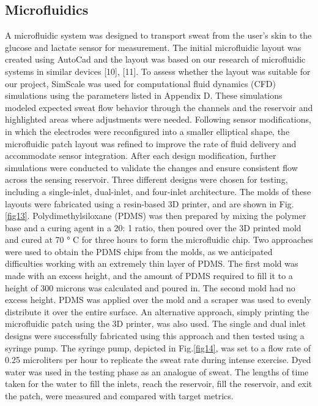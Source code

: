 \documentclass[conference]{IEEEtran}
\begin{document}
\subsection{Microfluidics}
A microfluidic system was designed to transport sweat from the user's skin to the glucose and lactate sensor for measurement. The initial microfluidic layout was created using AutoCad and the layout was based on our research of microfluidic systems in similar devices [10], [11]. To assess whether the layout was suitable for our project, SimScale was used for computational fluid dynamics (CFD) simulations using the parameters listed in Appendix D. These simulations modeled expected sweat flow behavior through the channels and the reservoir and highlighted areas where adjustments were needed.
Following sensor modifications, in which the electrodes were reconfigured into a smaller elliptical shape, the microfluidic patch layout was refined to improve the rate of fluid delivery and accommodate sensor integration. After each design modification, further simulations were conducted to validate the changes and ensure consistent flow across the sensing reservoir.
Three different designs were chosen for testing, including a single-inlet, dual-inlet, and four-inlet architecture. The molds of these layouts were fabricated using a resin-based 3D printer, and are shown in Fig.\ref{fig13}. Polydimethylsiloxane (PDMS) was then prepared by mixing the polymer base and a curing agent in a 20: 1 ratio, then poured over the 3D printed mold and cured at 70 ° C for three hours to form the microfluidic chip. Two approaches were used to obtain the PDMS chips from the molds, as we anticipated difficulties working with an extremely thin layer of PDMS. The first mold was made with an excess height, and the amount of PDMS required to fill it to a height of 300 microns was calculated and poured in. The second mold had no excess height. PDMS was applied over the mold and a scraper was used to evenly distribute it over the entire surface. An alternative approach, simply printing the microfluidic patch using the 3D printer, was also used. The single and dual inlet designs were successfully fabricated using this approach and then tested using a syringe pump. The syringe pump, depicted in Fig.\ref{fig14}, was set to a flow rate of 0.25 microliters per hour to replicate the sweat rate during intense exercise. Dyed water was used in the testing phase as an analogue of sweat. The lengths of time taken for the water to fill the inlets, reach the reservoir, fill the reservoir, and exit the patch, were measured and compared with target metrics.
\end{document}
